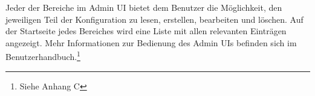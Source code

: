 Jeder der Bereiche im Admin UI bietet dem Benutzer die Möglichkeit, den jeweiligen Teil der Konfiguration zu lesen, erstellen, bearbeiten und löschen.
Auf der Startseite jedes Bereiches wird eine Liste mit allen relevanten Einträgen angezeigt.
Mehr Informationen zur Bedienung des Admin UIs befinden sich im Benutzerhandbuch.\footnote{Siehe Anhang C}

\clearpage
